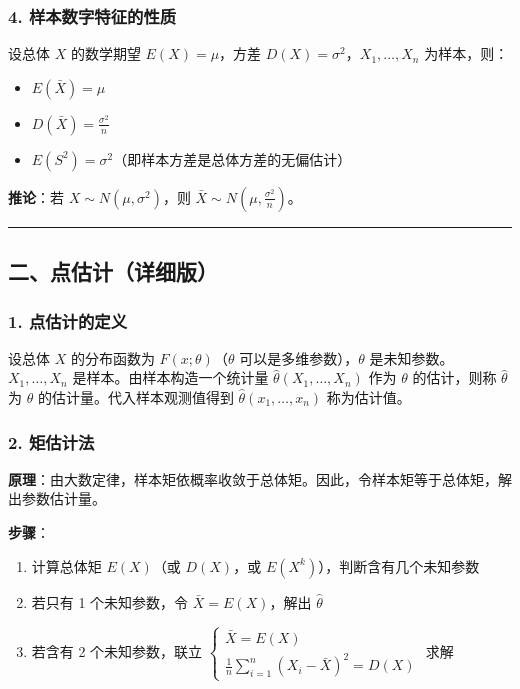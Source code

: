 \documentclass[12pt,a4paper]{ctexart}
\begin{document}
\subsubsection{4. 样本数字特征的性质}
设总体 $X$ 的数学期望 $E(X) = \mu$，方差 $D(X) = \sigma^2$，$X_1, \dots, X_n$ 为样本，则：
\begin{itemize}[noitemsep]
    \item $E(\bar{X}) = \mu$
    \item $D(\bar{X}) = \frac{\sigma^2}{n}$
    \item $E(S^2) = \sigma^2$（即样本方差是总体方差的无偏估计）
\end{itemize}

\textbf{推论}：若 $X \sim N(\mu, \sigma^2)$，则 $\bar{X} \sim N(\mu, \frac{\sigma^2}{n})$。

\vspace{1em}\hrule\vspace{1em}

\subsection{二、点估计（详细版）}

\subsubsection{1. 点估计的定义}
设总体 $X$ 的分布函数为 $F(x; \theta)$（$\theta$ 可以是多维参数），$\theta$ 是未知参数。$X_1, \dots, X_n$ 是样本。由样本构造一个统计量 $\hat{\theta}(X_1, \dots, X_n)$ 作为 $\theta$ 的估计，则称 $\hat{\theta}$ 为 $\theta$ 的估计量。代入样本观测值得到 $\hat{\theta}(x_1, \dots, x_n)$ 称为估计值。

\subsubsection{2. 矩估计法}
\textbf{原理}：由大数定律，样本矩依概率收敛于总体矩。因此，令样本矩等于总体矩，解出参数估计量。

\textbf{步骤}：
\begin{enumerate}[noitemsep]
    \item 计算总体矩 $E(X)$（或 $D(X)$，或 $E(X^k)$），判断含有几个未知参数
    \item 若只有 1 个未知参数，令 $\bar{X} = E(X)$，解出 $\hat{\theta}$
    \item 若含有 2 个未知参数，联立 $\begin{cases} \bar{X} = E(X) \\ \frac{1}{n} \sum_{i=1}^n (X_i - \bar{X})^2 = D(X) \end{cases}$ 求解
\end{enumerate}
\end{document}
